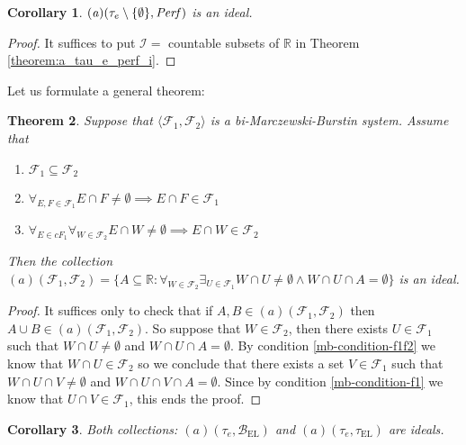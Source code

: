 \documentclass[12pt]{amsart}
\theoremstyle{plain}
\newtheorem{theorem}{Theorem}[section]
\newtheorem{corollary}[theorem]{Corollary}
\theoremstyle{definition}
\theoremstyle{remark}
\newcommand{\Perf}{{\it Perf}}
\newcommand{\real}{\mathbb{R}}
\newcommand{\cB}{{\mathcal B}}
\newcommand{\cF}{{\mathcal F}}
\newcommand{\cG}{{\mathcal G}}
\newcommand{\cI}{{\mathcal I}}
\newcommand{\aideal}{\mathit{(a)}}
\newcommand{\biMB}{bi-Marczewski-Burstin}
\newcommand{\tauEllentuck}{\tau_{\mathrm{EL}}}
\newcommand{\baseEllentuck}{\cB_{\mathrm{EL}}}
\begin{document}
\begin{corollary}
$\aideal(\tau_e\setminus\lbrace\emptyset\rbrace, \Perf)$ is an ideal.
\end{corollary}
\begin{proof}
It suffices to put $\cI =$ countable subsets of $\real$ in Theorem \ref{theorem:a_tau_e_perf_i}.
\end{proof}

Let us formulate a general theorem:

\begin{theorem}
Suppose that $\langle \cF_1, \cF_2 \rangle$ is a \biMB{} system.
Assume that 
\begin{enumerate}	
\item
\label{mb-condition-subset}
  $\cF_1 \subseteq \cF_2$
\item 
\label{mb-condition-f1}
  $\forall_{E,F \in \cF_1} E \cap F \not= \emptyset \implies E \cap F \in \cF_1$
\item
\label{mb-condition-f1f2}
  $\forall_{E \in cF_1} \forall_{W \in \cF_2} E \cap W \not= \emptyset \implies E \cap W \in \cF_2$  
\end{enumerate}	
Then the collection
$\aideal(\cF_1, \cF_2) = \lbrace A \subseteq \real\colon 
\forall_{W\in \cF_2} \exists_{U \in \cF_1}
W \cap U \not= \emptyset \wedge W \cap U \cap A = \emptyset
\rbrace$ 
is an ideal. 
\end{theorem}
\begin{proof}
It suffices only to check that if $A, B \in \aideal(\cF_1, \cF_2)$ then
$A\cup B \in \aideal(\cF_1, \cF_2)$.
So suppose that $W \in \cF_2$, then there exists $U\in\cF_1$
such that 
$W \cap U \not= \emptyset$ and $W \cap U \cap A = \emptyset$.
By condition \ref{mb-condition-f1f2} 
we know that $W \cap U \in \cF_2$ so
we conclude that
there exists a set $V \in \cF_1$ such that
$W \cap U \cap V \not= \emptyset$ and $W \cap U \cap V \cap A = \emptyset$.
Since by condition \ref{mb-condition-f1} we know that 
$U \cap V \in \cF_1$, this ends the proof.
\end{proof}

\begin{corollary}
Both collections: $\aideal(\tau_e, \baseEllentuck)$ and
$\aideal(\tau_e, \tauEllentuck)$ are ideals.
\end{corollary} 
\end{document}
